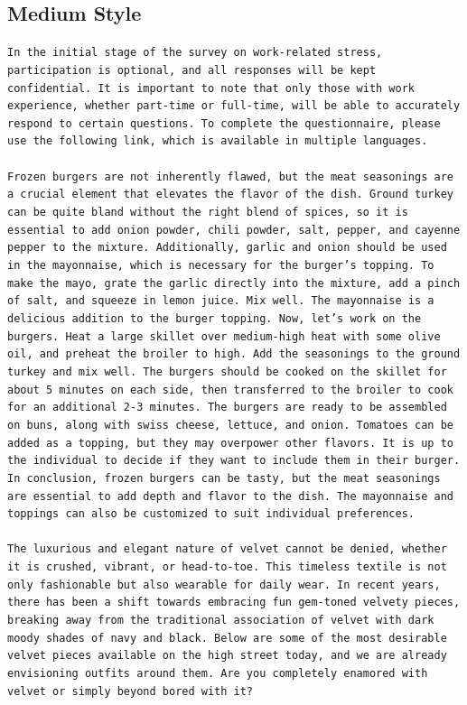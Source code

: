 \subsection*{Medium Style}
\begin{tcolorbox}[colback=gray!20, colframe=gray!75, rounded corners, sharp corners=northeast, sharp corners=southwest]
\texttt{In the initial stage of the survey on work-related stress, participation is optional, and all responses will be kept confidential. It is important to note that only those with work experience, whether part-time or full-time, will be able to accurately respond to certain questions. To complete the questionnaire, please use the following link, which is available in multiple languages.\\\\
Frozen burgers are not inherently flawed, but the meat seasonings are a crucial element that elevates the flavor of the dish. Ground turkey can be quite bland without the right blend of spices, so it is essential to add onion powder, chili powder, salt, pepper, and cayenne pepper to the mixture. Additionally, garlic and onion should be used in the mayonnaise, which is necessary for the burger's topping. To make the mayo, grate the garlic directly into the mixture, add a pinch of salt, and squeeze in lemon juice. Mix well. The mayonnaise is a delicious addition to the burger topping. Now, let's work on the burgers. Heat a large skillet over medium-high heat with some olive oil, and preheat the broiler to high. Add the seasonings to the ground turkey and mix well. The burgers should be cooked on the skillet for about 5 minutes on each side, then transferred to the broiler to cook for an additional 2-3 minutes. The burgers are ready to be assembled on buns, along with swiss cheese, lettuce, and onion. Tomatoes can be added as a topping, but they may overpower other flavors. It is up to the individual to decide if they want to include them in their burger. In conclusion, frozen burgers can be tasty, but the meat seasonings are essential to add depth and flavor to the dish. The mayonnaise and toppings can also be customized to suit individual preferences.\\\\
The luxurious and elegant nature of velvet cannot be denied, whether it is crushed, vibrant, or head-to-toe. This timeless textile is not only fashionable but also wearable for daily wear. In recent years, there has been a shift towards embracing fun gem-toned velvety pieces, breaking away from the traditional association of velvet with dark moody shades of navy and black. Below are some of the most desirable velvet pieces available on the high street today, and we are already envisioning outfits around them. Are you completely enamored with velvet or simply beyond bored with it?\\\\
}
\end{tcolorbox}
